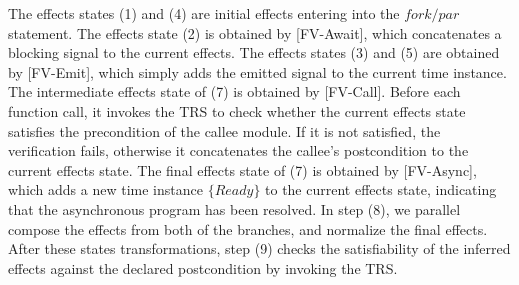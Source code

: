 \documentclass[acmsmall,review,anonymous]{acmart}\settopmatter{printfolios=true,printccs=false,printacmref=false}
\newcommand{\code}[1]{{\tt{\ensuremath{\m{#1}}}}}
\newcommand{\m}{\mathit}
\begin{document}
The effects states (1) and (4) are initial effects entering into the \code{fork/par} statement. The effects state (2) is obtained by [FV-Await], which concatenates a blocking signal 
 to the current effects. 
The effects states (3) and (5) are obtained by [FV-Emit], which simply adds the emitted  signal to the current time instance. The intermediate effects state of (7) is obtained by [FV-Call]. 
Before each function call, it invokes the TRS to check whether the current effects state satisfies the precondition of the callee module. If it is not satisfied, the verification fails, otherwise it concatenates the callee's postcondition to the current effects state. The final effects state of (7) is obtained by [FV-Async], which adds a new time instance \code{\{Ready\}} to the current effects state, indicating that the asynchronous program has been resolved. 
In step (8), we parallel compose the effects from both of the branches, and normalize the final effects. 
After these states transformations, step (9) checks the satisfiability of the inferred effects against the declared postcondition by invoking the TRS.
\end{document}
